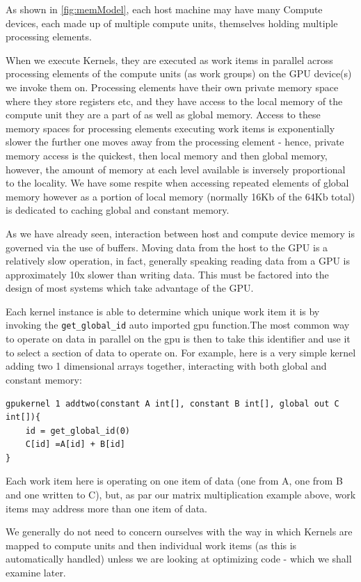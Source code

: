 \documentclass[conc-doc]{subfiles}
\begin{document}
As shown in \ref{fig:memModel}, each host machine may have many Compute devices, each made up of multiple compute units, themselves holding multiple processing elements.

When we execute Kernels, they are executed as work items in parallel across processing elements of the compute units (as work groups) on the GPU device(s) we invoke them on. Processing elements have their own private memory space where they store registers etc, and they have access to the local memory of the compute unit they are a part of as well as global memory. Access to these memory spaces for processing elements executing work items is exponentially slower the further one moves away from the processing element - hence, private memory access is the quickest, then local memory and then global memory, however, the amount of memory at each level available is inversely proportional to the locality. We have some respite when accessing repeated elements of global memory however as a portion of local memory (normally 16Kb of the 64Kb total) is dedicated to caching global and constant memory.

As we have already seen, interaction between host and compute device memory is governed via the use of buffers. Moving data from the host to the GPU is a relatively slow operation, in fact, generally speaking reading data from a GPU is approximately 10x slower than writing data. This must be factored into the design of most systems which take advantage of the GPU.

Each kernel instance is able to determine which unique work item it is by invoking the \lstinline{get_global_id} auto imported gpu function.The most common way to operate on data in parallel on the gpu is then to take this identifier and use it to select a section of data to operate on. For example, here is a very simple kernel adding two 1 dimensional arrays together, interacting with both global and constant memory:

\begin{lstlisting}
gpukernel 1 addtwo(constant A int[], constant B int[], global out C int[]){
	id = get_global_id(0)
	C[id] =A[id] + B[id]
}
\end{lstlisting}

Each work item here is operating on one item of data (one from A, one from B and one written to C), but, as par our matrix multiplication example above, work items may address more than one item of data.

We generally do not need to concern ourselves with the way in which Kernels are mapped to compute units and then individual work items (as this is automatically handled) unless we are looking at optimizing code - which we shall examine later.
\end{document}
